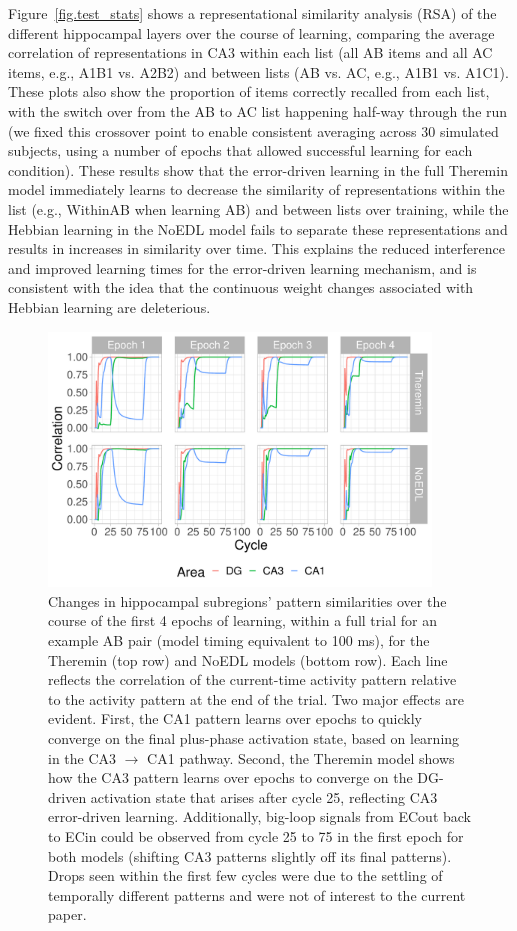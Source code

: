 \documentclass[11pt,twoside]{article}
\newif\myifpdf
\begin{document}
Figure~\ref{fig.test_stats} shows a representational similarity analysis (RSA) of the different hippocampal layers over the course of learning, comparing the average correlation of representations in CA3 within each list (all AB items and all AC items, e.g., A1B1 vs. A2B2) and between lists (AB vs. AC, e.g., A1B1 vs. A1C1).  These plots also show the proportion of items correctly recalled from each list, with the switch over from the AB to AC list happening half-way through the run (we fixed this crossover point to enable consistent averaging across 30 simulated subjects, using a number of epochs that allowed successful learning for each condition).  These results show that the error-driven learning in the full Theremin model immediately learns to decrease the similarity of representations within the list (e.g., WithinAB when learning AB) and between lists over training, while the Hebbian learning in the NoEDL model fails to separate these representations and results in increases in similarity over time.  This explains the reduced interference and improved learning times for the error-driven learning mechanism, and is consistent with the idea that the continuous weight changes associated with Hebbian learning are deleterious.

\begin{figure}
  \centering\includegraphics[width=4in]{fig_hip_edl_pat_sim}
  \caption{\footnotesize Changes in hippocampal subregions' pattern similarities over the course of the first 4 epochs of learning, within a full trial for an example AB pair (model timing equivalent to 100 ms), for the Theremin (top row) and NoEDL models (bottom row).  Each line reflects the correlation of the current-time activity pattern relative to the activity pattern at the end of the trial.  Two major effects are evident.  First, the CA1 pattern learns over epochs to quickly converge on the final plus-phase activation state, based on learning in the CA3 $\rightarrow$ CA1 pathway.  Second, the Theremin model shows how the CA3 pattern learns over epochs to converge on the DG-driven activation state that arises after cycle 25, reflecting CA3 error-driven learning.  Additionally, big-loop signals from ECout back to ECin could be observed from cycle 25 to 75 in the first epoch for both models (shifting CA3 patterns slightly off its final patterns).  Drops seen within the first few cycles were due to the settling of temporally different patterns and were not of interest to the current paper.}
\label{fig.pat_sim}
\end{figure}
\end{document}
